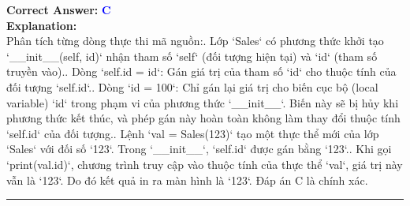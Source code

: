 \documentclass[11pt,a4paper]{article}
\begin{document}
\begin{minipage}{\textwidth}
\noindent \textbf{Correct Answer:} \textcolor{blue}{\textbf{C}} \\[4pt]
\noindent \textbf{Explanation:}\\
Phân tích từng dòng thực thi mã nguồn:. Lớp `Sales` có phương thức khởi tạo `__init__(self, id)` nhận tham số `self` (đối tượng hiện tại) và `id` (tham số truyền vào).. Dòng `self.id = id`: Gán giá trị của tham số `id` cho thuộc tính của đối tượng `self.id`.. Dòng `id = 100`: Chỉ gán lại giá trị cho biến cục bộ (local variable) `id` trong phạm vi của phương thức `__init__`. Biến này sẽ bị hủy khi phương thức kết thúc, và phép gán này hoàn toàn không làm thay đổi thuộc tính `self.id` của đối tượng.. Lệnh `val = Sales(123)` tạo một thực thể mới của lớp `Sales` với đối số `123`. Trong `__init__`, `self.id` được gán bằng `123`.. Khi gọi `print(val.id)`, chương trình truy cập vào thuộc tính của thực thể `val`, giá trị này vẫn là `123`.\newline
Do đó kết quả in ra màn hình là `123`. Đáp án C là chính xác.
\end{minipage}
\vspace{0.8cm}
\hrule
\vspace{0.5cm}
\end{document}
